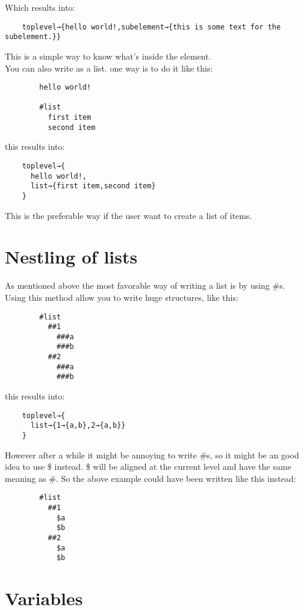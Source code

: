 \documentclass{book}
\begin{document}
	Which results into:
	
	\begin{verbatim}
	toplevel→{hello world!,subelement→{this is some text for the subelement.}}
	\end{verbatim}
	
	This is a simple way to know what's inside the element. \\
	You can also write as a list. one way is to do it like this:
	
	\begin{verbatim}
		hello world!
		
		#list
		  first item
		  second item
	\end{verbatim}
	
	this results into:
	
	\begin{verbatim}
	toplevel→{
	  hello world!,
	  list→{first item,second item}
	}
	\end{verbatim}
	
	This is the preferable way if the user want to create a list of items.
	
	\section{Nestling of lists}
	
	As mentioned above the most favorable way of writing a list is by using \#s.
	Using this method allow you to write huge structures, like this:
	
	\begin{verbatim}
		#list
		  ##1
		    ###a
		    ###b
		  ##2
		    ###a
		    ###b
	\end{verbatim}
	
	this results into:
	
	\begin{verbatim}
	toplevel→{
	  list→{1→{a,b},2→{a,b}}
	}
	\end{verbatim}
	
	However after a while it might be annoying to write \#s, so it might be an good idea to use \$ instead.
	\$ will be aligned at the current level and have the same meaning as \#.
	So the above example could have been written like this instead:
	
	\begin{verbatim}
		#list
		  ##1
		    $a
		    $b
		  ##2
		    $a
		    $b
	\end{verbatim}
	
	\section{Variables}
	
\end{document}
